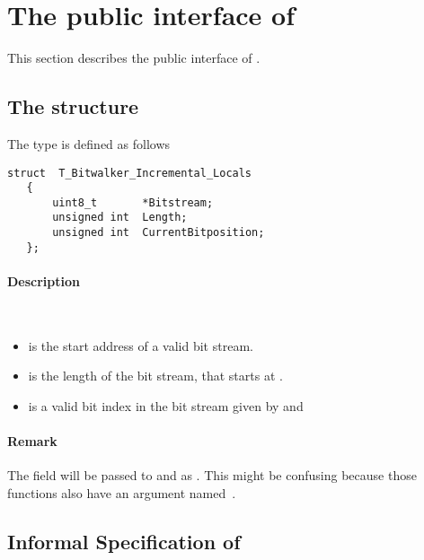 
\section{The public interface of \bitwalker}
\label{sec:bitwalker-public}

This section describes the public interface of \bitwalker.

\subsection{The structure \bitwalkertype}


The type \bitwalkertype is defined as follows\\[1em]

\begin{lstlisting}[style=acsl-block]
   struct  T_Bitwalker_Incremental_Locals
   {
       uint8_t       *Bitstream;
       unsigned int  Length;
       unsigned int  CurrentBitposition;
   };
\end{lstlisting}


\paragraph{Description}~

\begin{itemize}

   \item {} is  the start address of a valid bit stream.
   \item {} is the length of the bit stream, that starts at .
   \item {} is a valid bit index in
              the bit stream given by  and 

\end{itemize}

\paragraph*{Remark}
The field  will be passed to \peek and \poke as .
This might be confusing because those functions also have an argument 
named~.

\clearpage

\subsection{Informal Specification of }


